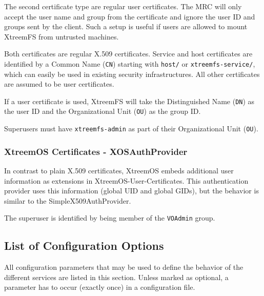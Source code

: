 \documentclass[a4paper,10pt]{book}
\begin{document}
The second certificate type are regular user certificates. The MRC will only accept the user name and group from the certificate and ignore the user ID and groups sent by the client. Such a setup is useful if users are allowed to mount XtreemFS from untrusted machines.

Both certificates are regular X.509 certificates. Service and host certificates are identified by a Common Name (\texttt{CN}) starting with \texttt{host/} or \texttt{xtreemfs-service/}, which can easily be used in existing security infrastructures. All other certificates are assumed to be user certificates.

If a user certificate is used, XtreemFS will take the Distinguished Name (\texttt{DN}) as the user ID and the Organizational Unit (\texttt{OU}) as the group ID.

Superusers must have \texttt{xtreemfs-admin} as part of their Organizational Unit (\texttt{OU}).

\subsubsection{XtreemOS Certificates - XOSAuthProvider}

In contrast to plain X.509 certificates, XtreemOS embeds additional user information as extensions in XtreemOS-User-Certificates. This authentication provider uses this information (global UID and global GIDs), but the behavior is similar to the SimpleX509AuthProvider.

The superuser is identified by being member of the \texttt{VOAdmin} group.

\subsection{List of Configuration Options}
\label{sec:config}

All configuration parameters that may be used to define the behavior of the different services are listed in this section. Unless marked as optional, a parameter has to occur (exactly once) in a configuration file.

\end{document}
